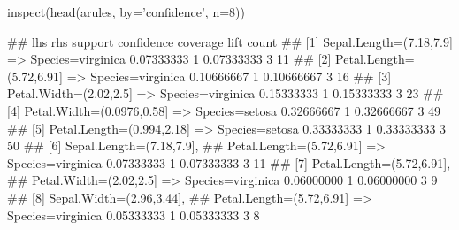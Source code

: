 \begin{Schunk}
% --begin: "casestudy-assoc-arules-view"
\begin{Sinput}
inspect(head(arules, by='confidence', n=8))
\end{Sinput}
\begin{Soutput}
##     lhs                            rhs                    support confidence   coverage lift count
## [1] {Sepal.Length=(7.18,7.9]}   => {Species=virginica} 0.07333333          1 0.07333333    3    11
## [2] {Petal.Length=(5.72,6.91]}  => {Species=virginica} 0.10666667          1 0.10666667    3    16
## [3] {Petal.Width=(2.02,2.5]}    => {Species=virginica} 0.15333333          1 0.15333333    3    23
## [4] {Petal.Width=(0.0976,0.58]} => {Species=setosa}    0.32666667          1 0.32666667    3    49
## [5] {Petal.Length=(0.994,2.18]} => {Species=setosa}    0.33333333          1 0.33333333    3    50
## [6] {Sepal.Length=(7.18,7.9],                                                                     
##      Petal.Length=(5.72,6.91]}  => {Species=virginica} 0.07333333          1 0.07333333    3    11
## [7] {Petal.Length=(5.72,6.91],                                                                    
##      Petal.Width=(2.02,2.5]}    => {Species=virginica} 0.06000000          1 0.06000000    3     9
## [8] {Sepal.Width=(2.96,3.44],                                                                     
##      Petal.Length=(5.72,6.91]}  => {Species=virginica} 0.05333333          1 0.05333333    3     8
\end{Soutput}
%
% --end: "casestudy-assoc-arules-view"
\end{Schunk}
